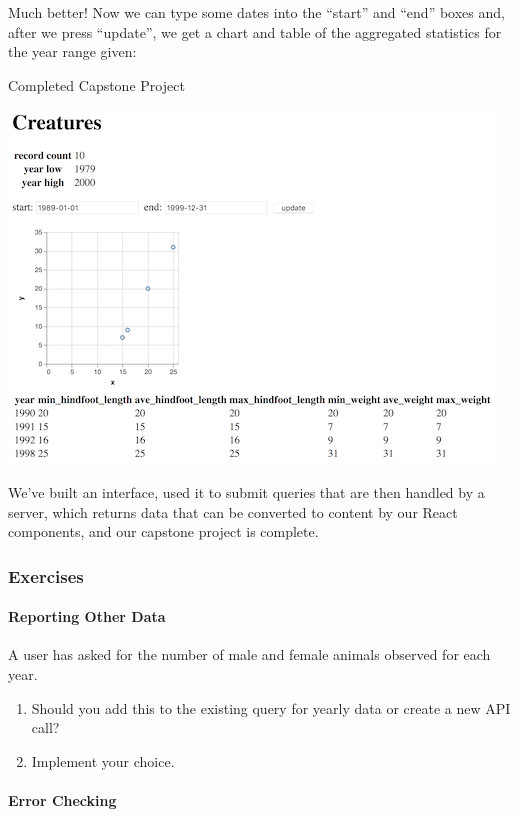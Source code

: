 Much better! Now we can type some dates into the ``start'' and ``end''
boxes and, after we press ``update'', we get a chart and table of the
aggregated statistics for the year range given:

Completed Capstone Project

\includegraphics{../../files/capstone-complete.png}

We've built an interface, used it to submit queries that are then
handled by a server, which returns data that can be converted to content
by our React components, and our capstone project is complete.

\subsubsection{Exercises}\label{s:capstone-exercises}

\paragraph{Reporting Other Data}\label{reporting-other-data}

A user has asked for the number of male and female animals observed for
each year.

\begin{enumerate}
\tightlist
\item
  Should you add this to the existing query for yearly data or create a
  new API call?
\item
  Implement your choice.
\end{enumerate}

\paragraph{Error Checking}\label{error-checking}

